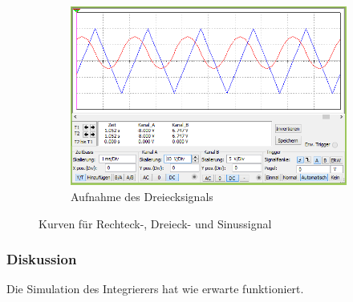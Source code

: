 \documentclass[12pt,a4paper]{article}
\begin{document}
\begin{figure}[H]
        \hfill
        \begin{subfigure}[t]{0.28\textwidth}
                \includegraphics[width=\textwidth , scale = 0.4]{4_4_drei.PNG}
                \caption[Aufnahme des Dreiecksignals]{Aufnahme des Dreiecksignals}
  				\label{fig:4_4_drei}
        \end{subfigure}
        \caption{Kurven  für Rechteck-, Dreieck- und Sinussignal}
        \label{fig:4_4}
\end{figure}

\subsubsection{Diskussion}

Die Simulation des Integrierers hat wie erwarte funktioniert.
\end{document}
